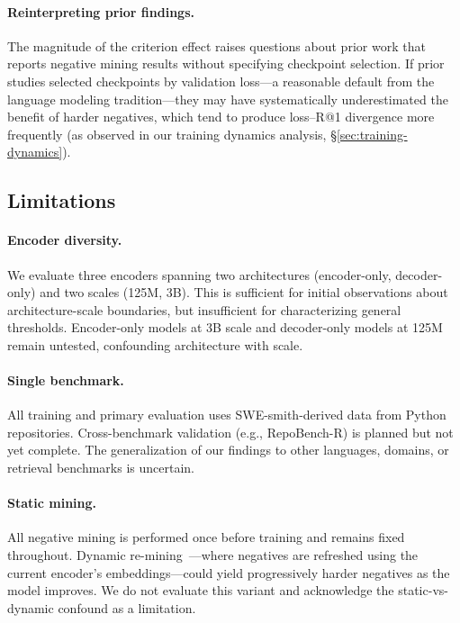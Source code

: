 \paragraph{Reinterpreting prior findings.}
The magnitude of the criterion effect raises questions about prior work that reports negative mining results without specifying checkpoint selection.
If prior studies selected checkpoints by validation loss---a reasonable default from the language modeling tradition---they may have systematically underestimated the benefit of harder negatives, which tend to produce loss--R@1 divergence more frequently (as observed in our training dynamics analysis, \S\ref{sec:training-dynamics}).

\subsection{Limitations}
\label{sec:limitations}

\paragraph{Encoder diversity.}
We evaluate three encoders spanning two architectures (encoder-only, decoder-only) and two scales (125M, 3B).
This is sufficient for initial observations about architecture-scale boundaries, but insufficient for characterizing general thresholds.
Encoder-only models at 3B scale and decoder-only models at 125M remain untested, confounding architecture with scale.

\paragraph{Single benchmark.}
All training and primary evaluation uses SWE-smith-derived data from Python repositories.
Cross-benchmark validation (e.g., RepoBench-R) is planned but not yet complete.
The generalization of our findings to other languages, domains, or retrieval benchmarks is uncertain.

\paragraph{Static mining.}
All negative mining is performed once before training and remains fixed throughout.
Dynamic re-mining~\cite{xiong2021ance}---where negatives are refreshed using the current encoder's embeddings---could yield progressively harder negatives as the model improves.
We do not evaluate this variant and acknowledge the static-vs-dynamic confound as a limitation.

